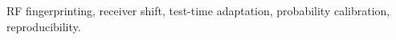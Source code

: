 \documentclass[journal]{IEEEtran}
\title{\studytitle}
\author{OpenEW-SA Internal Review\\Authors, affiliations, ORCIDs and corresponding author require human confirmation}
\begin{document}
\maketitle

\begin{IEEEkeywords}RF fingerprinting, receiver shift, test-time adaptation, probability calibration, reproducibility.\end{IEEEkeywords}


\end{document}
